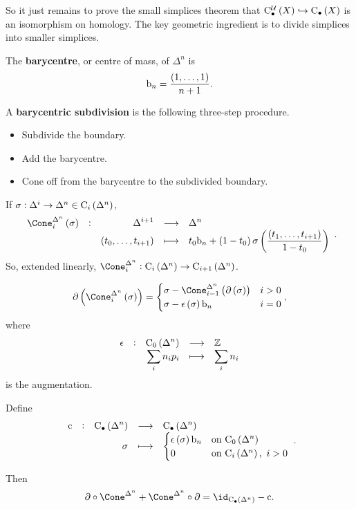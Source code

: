 So it just remains to prove the small simplices theorem that $ \C_\bullet^\UUU\br{X} \hookrightarrow \C_\bullet\br{X} $ is an isomorphism on homology. The key geometric ingredient is to divide simplices into smaller simplices.

\begin{definition*}
The \textbf{barycentre}, or centre of mass, of $ \Delta^n $ is
$$ \b_n = \dfrac{\br{1, \dots, 1}}{n + 1}. $$
\end{definition*}

A \textbf{barycentric subdivision} is the following three-step procedure.
\begin{itemize}
\item Subdivide the boundary.
\item Add the barycentre.
\item Cone off from the barycentre to the subdivided boundary.
\end{itemize}

\begin{definition*}
If $ \sigma : \Delta^i \to \Delta^n \in \C_i\br{\Delta^n} $,
$$ \function[\Cone_i^{\Delta^n}\br{\sigma}]{\Delta^{i + 1}}{\Delta^n}{\br{t_0, \dots, t_{i + 1}}}{t_0\b_n + \br{1 - t_0}\sigma\br{\dfrac{\br{t_1, \dots, t_{i + 1}}}{1 - t_0}}}. $$
So, extended linearly, $ \Cone_i^{\Delta^n} : \C_i\br{\Delta^n} \to \C_{i + 1}\br{\Delta^n} $.
\end{definition*}

\begin{exercise*}
$$ \da\br{\Cone_i^{\Delta^n}\br{\sigma}} =
\begin{cases}
\sigma - \Cone_{i - 1}^{\Delta^n}\br{\da\br{\sigma}} & i > 0 \\
\sigma - \epsilon\br{\sigma}\b_n & i = 0
\end{cases},
$$
where
$$ \function[\epsilon]{\C_0\br{\Delta^n}}{\ZZ}{\sum_i n_ip_i}{\sum_i n_i} $$
is the augmentation.
\end{exercise*}

\begin{definition*}
Define
$$ \function[\c]{\C_\bullet\br{\Delta^n}}{\C_\bullet\br{\Delta^n}}{\sigma}{
\begin{cases}
\epsilon\br{\sigma}\b_n & \text{on} \ \C_0\br{\Delta^n} \\
0 & \text{on} \ \C_i\br{\Delta^n}, \ i > 0
\end{cases}
}. $$
\end{definition*}

Then
$$ \da \circ \Cone^{\Delta^n} + \Cone^{\Delta^n} \circ \da = \id_{\C_\bullet\br{\Delta^n}} - \c. $$

